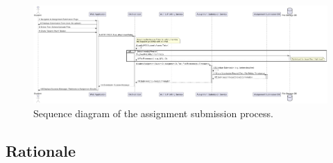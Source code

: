 \begin{figure}[h]
    \centering
    \includegraphics[width=0.9\linewidth]{Architettura/imgs/assign_submission_seq.pdf}
    \caption{Sequence diagram of the assignment submission process.}
    \label{fig:seqAssignmentSubmission}
\end{figure}

\subsection{Rationale}

